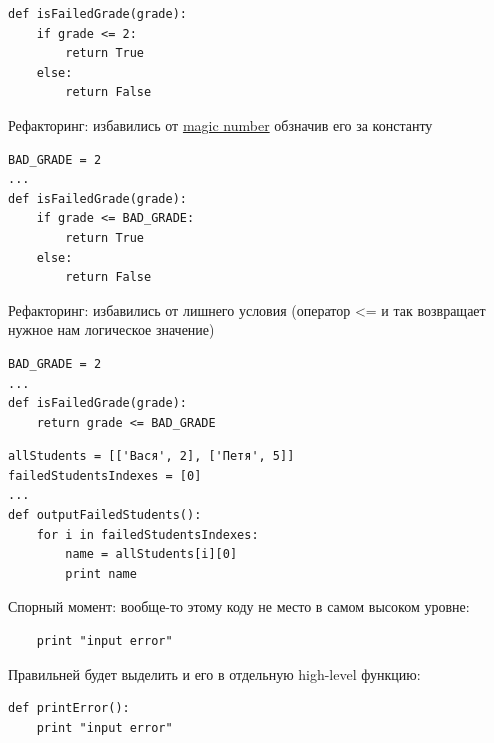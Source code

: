 {\begin{frame}[fragile]
  \begin{verbatim}
def isFailedGrade(grade):
    if grade <= 2:
        return True
    else:
        return False
  \end{verbatim}
\end{frame}

\begin{frame}[fragile]
  Рефакторинг: избавились от \underline{magic number} обзначив его за константу
  \vspace{1cm}
  \begin{verbatim}
BAD_GRADE = 2
...
def isFailedGrade(grade):
    if grade <= BAD_GRADE:
        return True
    else:
        return False
  \end{verbatim}
\end{frame}

\begin{frame}[fragile]
  Рефакторинг: избавились от лишнего условия (оператор <= и так возвращает нужное нам логическое значение)
  \vspace{1cm}
  \begin{verbatim}
BAD_GRADE = 2
...
def isFailedGrade(grade):
    return grade <= BAD_GRADE
  \end{verbatim}
\end{frame}

\begin{frame}[fragile]
  \begin{verbatim}
allStudents = [['Вася', 2], ['Петя', 5]]
failedStudentsIndexes = [0]
...
def outputFailedStudents():
    for i in failedStudentsIndexes:
        name = allStudents[i][0]
        print name
  \end{verbatim}
\end{frame}

\begin{frame}[fragile]
  Спорный момент: вообще-то этому коду не место в самом высоком уровне:

  \vspace{1cm}
  \begin{verbatim}
    print "input error"
  \end{verbatim}
\end{frame}

\begin{frame}[fragile]
  Правильней будет выделить и его в отдельную high-level функцию:

  \vspace{0.5cm}
  \begin{verbatim}
def printError():
    print "input error"


\end{verbatim}
\end{frame}}
